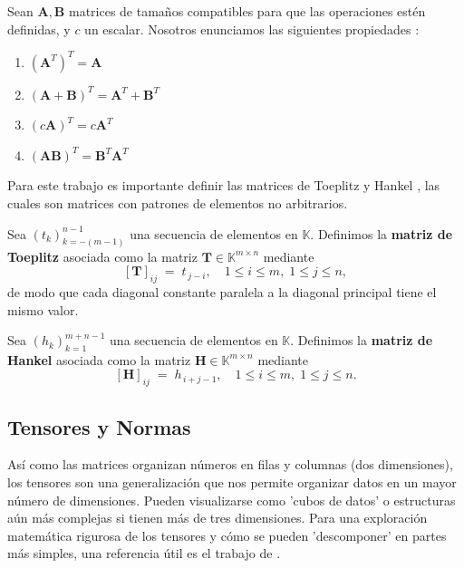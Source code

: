 \begin{proposition}
\label{prop:transpose_properties_general}
Sean $\mathbf{A}, \mathbf{B}$ matrices de tamaños compatibles para que las operaciones estén definidas, y $c$ un escalar. Nosotros enunciamos las siguientes propiedades \citep{Bishop2006}:
\begin{enumerate}
    \item $(\mathbf{A}^T)^T = \mathbf{A}$
    \item $(\mathbf{A}+\mathbf{B})^T = \mathbf{A}^T + \mathbf{B}^T$
    \item $(c\mathbf{A})^T = c\mathbf{A}^T$
    \item $(\mathbf{A}\mathbf{B})^T = \mathbf{B}^T \mathbf{A}^T$
\end{enumerate}
\end{proposition}

Para este trabajo es importante definir las matrices de Toeplitz \citep{gray2006toeplitz} y Hankel \citep{widom1966hankel}, las cuales son matrices con patrones de elementos no  arbitrarios. 

\begin{definition}
\label{def:toeplitz_matrix}
Sea $(t_k)_{k=-(m-1)}^{n-1}$ una secuencia de elementos en $\mathbb{K}$. Definimos la \textbf{matriz de Toeplitz} asociada como la matriz $\mathbf{T}\in\mathbb{K}^{m\times n}$ mediante
\[
[\mathbf{T}]_{ij} \;=\; t_{\,j - i},
\quad 1 \le i \le m,\; 1 \le j \le n,
\]
de modo que cada diagonal constante paralela a la diagonal principal tiene el mismo valor.
\end{definition}

\begin{definition}
\label{def:hankel_matrix}
Sea $(h_k)_{k=1}^{m+n-1}$ una secuencia de elementos en $\mathbb{K}$. Definimos la \textbf{matriz de Hankel} asociada como la matriz $\mathbf{H}\in\mathbb{K}^{m\times n}$ mediante
\[
[\mathbf{H}]_{ij} \;=\; h_{\,i+j-1},
\quad 1 \le i \le m,\; 1 \le j \le n.
\]
\end{definition}


\subsection{Tensores y Normas}
\label{subsec:tensors_norms}

Así como las matrices organizan números en filas y columnas (dos dimensiones), los tensores son una generalización que nos permite organizar datos en un mayor número de dimensiones. Pueden visualizarse como 'cubos de datos' o estructuras aún más complejas si tienen más de tres dimensiones. Para una exploración matemática rigurosa de los tensores y cómo se pueden 'descomponer' en partes más simples, una referencia útil es el trabajo de \citet{KoldaBader2009}.

